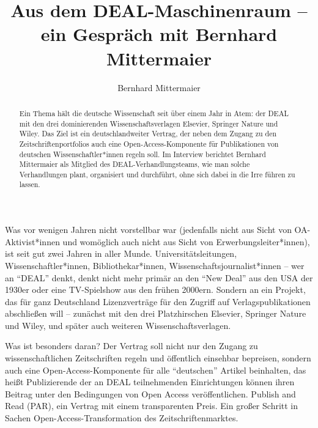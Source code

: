 \documentclass[a4paper,
fontsize=11pt,
oneside,
numbers=noperiodatend,
parskip=half-,
bibliography=totoc,
final
]{scrartcl}
\title{\LARGE{Aus dem DEAL-Maschinenraum -- ein Gespräch mit Bernhard Mittermaier}} %
\author{Bernhard Mittermaier} %
\date{}
\begin{document}
\maketitle
\thispagestyle{fancyplain} 

\begin{abstract}
Ein Thema hält die deutsche Wissenschaft seit über einem Jahr in Atem:
der DEAL mit den drei dominierenden Wissenschaftsverlagen Elsevier,
Springer Nature und Wiley. Das Ziel ist ein deutschlandweiter Vertrag,
der neben dem Zugang zu den Zeitschriftenportfolios auch eine
Open-Access-Komponente für Publikationen von deutschen
Wissenschaftler*innen regeln soll. Im Interview berichtet Bernhard
Mittermaier als Mitglied des DEAL-Verhandlungsteams, wie man solche
Verhandlungen plant, organisiert und durchführt, ohne sich dabei in die
Irre führen zu lassen.
\end{abstract}

Was vor wenigen Jahren nicht vorstellbar war (jedenfalls nicht aus Sicht
von OA-Aktivist*innen und womöglich auch nicht aus Sicht von
Erwerbungsleiter*innen), ist seit gut zwei Jahren in aller Munde.
Universitätsleitungen, Wissenschaftler*innen, Bibliothekar*innen,
Wissenschaftsjournalist*innen -- wer an \enquote{DEAL} denkt, denkt
nicht mehr primär an den \enquote{New Deal} aus den USA der 1930er oder
eine TV-Spielshow aus den frühen 2000ern. Sondern an ein Projekt, das
für ganz Deutschland Lizenzverträge für den Zugriff auf
Verlagspublikationen abschließen will -- zunächst mit den drei
Platzhirschen Elsevier, Springer Nature und Wiley, und später auch
weiteren Wissenschaftsverlagen.

Was ist besonders daran? Der Vertrag soll nicht nur den Zugang zu
wissenschaftlichen Zeitschriften regeln und öffentlich einsehbar
bepreisen, sondern auch eine Open-Access-Komponente für alle
\enquote{deutschen} Artikel beinhalten, das heißt Publizierende der an
DEAL teilnehmenden Einrichtungen können ihren Beitrag unter den
Bedingungen von Open Access veröffentlichen. Publish and Read (PAR), ein
Vertrag mit einem transparenten Preis. Ein großer Schritt in Sachen
Open-Access-Transformation des Zeitschriftenmarktes.
\end{document}
